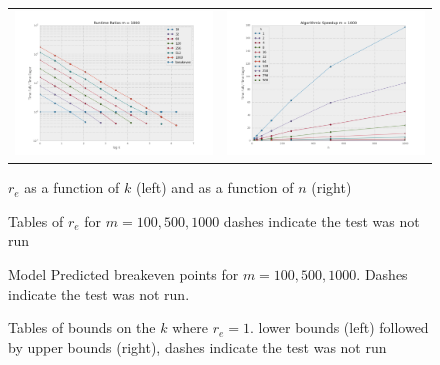 \begin{figure}
\begin{tabular}{cc}
\includegraphics[width=\plotwidth]{tratio1000.png} & \includegraphics[width=\plotwidth]{tratioarc1000.png}\\
\end{tabular}
\caption{$r_e$ as a function of $k$ (left) and as a function of $n$ (right) }
\label{fig:1000plot}
\end{figure}
\begin{figure}
\centering

\caption{Tables of $r_e$ for $m=100,500,1000$ dashes indicate the test was not run}
\label{table:sfm}
\end{figure}

\begin{figure}
\centering

\caption{Model Predicted breakeven points for $m=100,500,1000$. Dashes indicate the test was not run.}
\label{table:keven}
\end{figure}

\begin{figure}
\centering

\caption{Tables of bounds on the $k$ where $r_e=1$. lower bounds (left) followed by upper bounds (right), dashes indicate the test was not run}
\label{table:bounds}
\end{figure}
